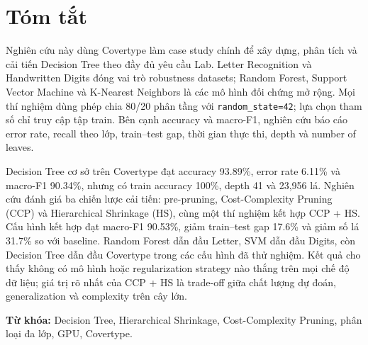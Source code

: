 \chapter*{Tóm tắt}

Nghiên cứu này dùng Covertype làm case study chính để xây dựng, phân tích và cải tiến Decision Tree theo đầy đủ yêu cầu Lab. Letter Recognition và Handwritten Digits đóng vai trò robustness datasets; Random Forest, Support Vector Machine và K-Nearest Neighbors là các mô hình đối chứng mở rộng. Mọi thí nghiệm dùng phép chia 80/20 phân tầng với \texttt{random\_state=42}; lựa chọn tham số chỉ truy cập tập train. Bên cạnh accuracy và macro-F1, nghiên cứu báo cáo error rate, recall theo lớp, train--test gap, thời gian thực thi, depth và number of leaves.

Decision Tree cơ sở trên Covertype đạt accuracy 93.89\%, error rate 6.11\% và macro-F1 90.34\%, nhưng có train accuracy 100\%, depth 41 và 23,956 lá. Nghiên cứu đánh giá ba chiến lược cải tiến: pre-pruning, Cost-Complexity Pruning (CCP) và Hierarchical Shrinkage (HS), cùng một thí nghiệm kết hợp CCP + HS. Cấu hình kết hợp đạt macro-F1 90.53\%, giảm train--test gap 17.6\% và giảm số lá 31.7\% so với baseline. Random Forest dẫn đầu Letter, SVM dẫn đầu Digits, còn Decision Tree dẫn đầu Covertype trong các cấu hình đã thử nghiệm. Kết quả cho thấy không có mô hình hoặc regularization strategy nào thắng trên mọi chế độ dữ liệu; giá trị rõ nhất của CCP + HS là trade-off giữa chất lượng dự đoán, generalization và complexity trên cây lớn.

\noindent\textbf{Từ khóa:} Decision Tree, Hierarchical Shrinkage, Cost-Complexity Pruning, phân loại đa lớp, GPU, Covertype.

\clearpage
